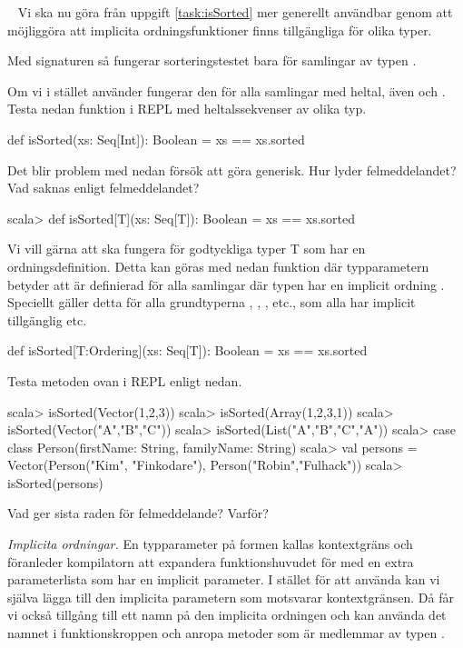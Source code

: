 \Task \label{task:implicit-ordering} \what~  Vi ska nu göra  från uppgift \ref{task:isSorted} mer generellt användbar genom att möjliggöra att implicita ordningsfunktioner finns tillgängliga för olika typer.

\Subtask  Med signaturen   så
fungerar sorteringstestet bara för samlingar av typen .

Om vi i stället använder
 fungerar den för alla samlingar med heltal, även  och . Testa nedan funktion i REPL med heltalssekvenser av olika typ.
\begin{Code}
def isSorted(xs: Seq[Int]): Boolean = xs == xs.sorted
\end{Code}

\Subtask Det blir problem med nedan försök att göra  generisk. Hur lyder felmeddelandet? Vad saknas enligt felmeddelandet?
\begin{REPLnonum}
scala> def isSorted[T](xs: Seq[T]): Boolean = xs == xs.sorted
\end{REPLnonum}

\Subtask Vi vill gärna att  ska fungera för godtyckliga typer T som har en ordningsdefinition. Detta kan göras med nedan funktion där typparametern \code{[T:Ordering]} betyder att  är definierad för alla samlingar där typen  har en implicit ordning . Speciellt gäller detta för alla grundtyperna , , , etc., som alla har implicit tillgänglig  etc.
\begin{Code}
def isSorted[T:Ordering](xs: Seq[T]): Boolean = xs == xs.sorted
\end{Code}
Testa metoden ovan i REPL enligt nedan.
\begin{REPL}
scala> isSorted(Vector(1,2,3))
scala> isSorted(Array(1,2,3,1))
scala> isSorted(Vector("A","B","C"))
scala> isSorted(List("A","B","C","A"))
scala> case class Person(firstName: String, familyName: String)
scala> val persons = Vector(Person("Kim", "Finkodare"), Person("Robin","Fulhack"))
scala> isSorted(persons)
\end{REPL}
Vad ger sista raden för felmeddelande? Varför?


\Subtask \emph{Implicita ordningar.} En typparameter på formen \code{[T:Ordering]} kallas kontextgräns  och föranleder kompilatorn att expandera funktionshuvudet för  med en extra parameterlista som har en implicit parameter. I stället för att använda \code{[T:Ordering]} kan vi själva lägga till den implicita parametern som motsvarar kontextgränsen. Då får vi också tillgång till ett namn på den implicita ordningen och kan använda det namnet i funktionskroppen och anropa metoder som är medlemmar av typen .

